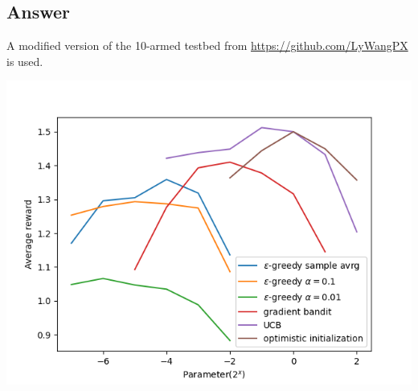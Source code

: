 \documentclass{article}
\begin{document}
    \subsection*{Answer}

    A modified version of the 10-armed testbed from \href{https://github.com/LyWangPX/Reinforcement-Learning-2nd-Edition-by-Sutton-Exercise-Solutions}{https://github.com/LyWangPX} is used.

    \includegraphics[scale=0.5]{figure_e_2_11}
\end{document}
